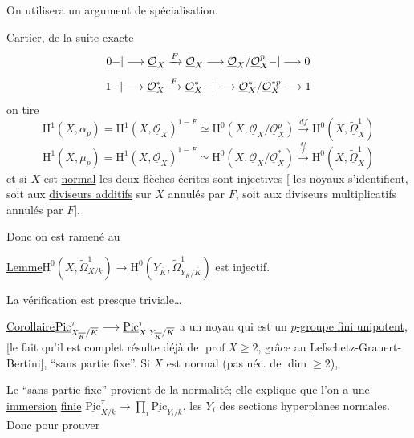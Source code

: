 
On utilisera un argument de spécialisation.

   Cartier, de la suite exacte
\[
0{-}|\longrightarrow\underline{\mathcal{O}}_X\xrightarrow{F}\underline{\mathcal{O}}_X\longrightarrow\underline{\mathcal{O}}_X/\underline{\mathcal{O}}_X^p{-}|\longrightarrow0
\]
\[
1{-}|\longrightarrow\underline{\mathcal{O}}_X^*\xrightarrow{F}\underline{\mathcal{O}}_X^*{-}|\longrightarrow\underline{\mathcal{O}}_X^*/\underline{\mathcal{O}}_X^{*p}\longrightarrow1
\]
 on tire
\[
\mathrm{H}^1(X,\alpha_p)=\mathrm{H}^1(X,\underline{\mathcal{O}}_X)^{1-F}\simeq\mathrm{H}^0(X,\underline{\mathcal{O}}_X/\underline{\mathcal{O}}_X^p)\xrightarrow{df}\mathrm{H}^0(X,\underline{\widetilde{\Omega}}^1_X)
\]
\[
\mathrm{H}^1(X,\mu_p)=\mathrm{H}^1(X,\underline{\mathcal{O}}_X)^{1-F}\simeq\mathrm{H}^0(X,\underline{\mathcal{O}}_X/\underline{\mathcal{O}}_X^*)\xrightarrow{\frac{df}{f}}\mathrm{H}^0(X,\underline{\widetilde{\Omega}}^1_X)
\]
et si $X$ est \uline{normal} les deux flèches écrites sont injectives [ les noyaux s'identifient, soit aux \uline{diviseurs additifs} sur $X$ annulés par $F$, soit aux diviseurs multiplicatifs annulés par $F$].

Donc on est ramené au

\uline{Lemme}\quad $\mathrm{H}^0(X,\widetilde{\Omega}^1_{X/k})\longrightarrow\mathrm{H}^0(Y_{\overline{K}},\widetilde{\Omega}^1_{Y_{\overline{K}}/\overline{K}})$ est injectif.

La vérification est presque triviale\ldots

\uline{Corollaire}\quad $\underline{\mathrm{Pic}}^\tau_{X_{\overline{K}}/\overline{K}}\longrightarrow\underline{\mathrm{Pic}}^\tau_{X|Y_{\overline{K}}/\overline{K}}$ a un noyau qui est un \uline{$p$-groupe fini unipotent}, [le fait qu'il est complet résulte déjà de $\operatorname{prof}X\geq2$, grâce au  Lefschetz-Grauert-Bertini], ``sans partie fixe''. Si $X$ est normal (pas néc. de $\dim\geq2$), 

Le ``sans partie fixe'' provient de la normalité; elle explique que l'on a une \uline{immersion} \uline{finie} $\underline{\mathrm{Pic}}^\tau_{X/k}\longrightarrow\prod_i\underline{\mathrm{Pic}}_{Y_i/k}$, les $Y_i$ des sections hyperplanes  normales. Donc pour prouver
